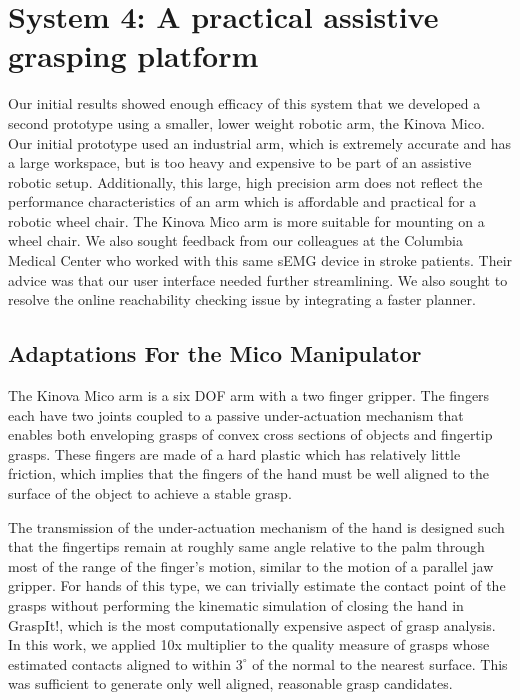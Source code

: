 \section*{System 4: A practical assistive grasping platform}
\setcounter{subsection}{0}
\renewcommand*{\theHsection}{chX.\the\value{section}}
Our initial results showed enough efficacy of this system that we developed a second prototype using a smaller, lower weight robotic arm, the Kinova Mico. Our initial prototype used an industrial arm, which is extremely accurate and has a large workspace, but is too heavy and expensive to be part of an assistive robotic setup. Additionally, this large, high precision arm does not reflect the performance characteristics of an arm which is affordable and practical for a robotic wheel chair. The Kinova Mico arm is more suitable for mounting on a wheel chair. 
We also sought feedback from our colleagues at the Columbia Medical Center who worked with this same sEMG device in stroke patients. Their advice was that our user interface needed further streamlining. We also sought to resolve the online reachability checking issue by integrating a faster planner. 

\subsection{Adaptations For the Mico Manipulator}
The Kinova Mico arm is a six DOF arm with a two finger gripper. The fingers each have two joints coupled to a passive under-actuation mechanism that enables both enveloping grasps of convex cross sections of objects and fingertip grasps. These fingers are made of a hard plastic which has relatively little friction, which implies that the fingers of the hand must be well aligned to the surface of the object to achieve a stable grasp. 

The transmission of the under-actuation mechanism of the hand is designed such that the fingertips remain at roughly same angle relative to the palm through most of the range of the finger's motion, similar to the motion of a parallel jaw gripper. For hands of this type, we can trivially estimate the contact point of the grasps without performing the kinematic simulation of closing the hand in GraspIt!, which is the most computationally expensive aspect of grasp analysis. In this work, we applied 10x multiplier to the quality measure of grasps whose estimated contacts aligned to within $3^{\circ}$ of the normal to the nearest surface. This was sufficient to generate only well aligned, reasonable grasp candidates. 

